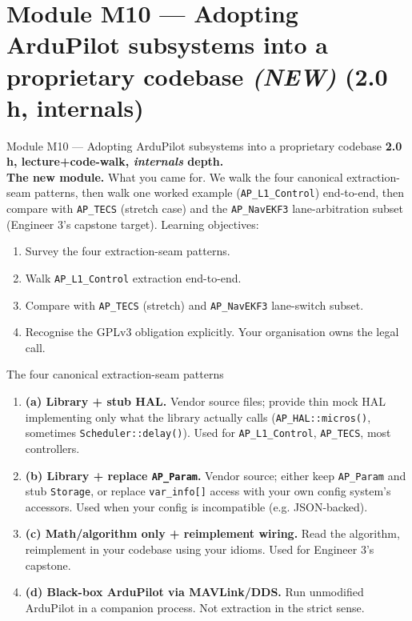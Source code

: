\documentclass[aspectratio=169,11pt]{beamer}
\begin{document}
\section{Module M10 --- Adopting ArduPilot subsystems into a proprietary codebase \emph{(NEW)} (2.0 h, internals)}

\begin{frame}{Module M10 --- Adopting ArduPilot subsystems into a proprietary codebase}
  \textbf{2.0 h, lecture+code-walk, \emph{internals} depth.}\\[1ex]
  \textbf{The new module.} What you came for.
  \vfill
  We walk the four canonical extraction-seam patterns, then walk one worked example (\texttt{AP\_L1\_Control}) end-to-end, then compare with \texttt{AP\_TECS} (stretch case) and the \texttt{AP\_NavEKF3} lane-arbitration subset (Engineer 3's capstone target).
  \vfill
  Learning objectives:
  \begin{enumerate}
    \item Survey the four extraction-seam patterns.
    \item Walk \texttt{AP\_L1\_Control} extraction end-to-end.
    \item Compare with \texttt{AP\_TECS} (stretch) and \texttt{AP\_NavEKF3} lane-switch subset.
    \item Recognise the GPLv3 obligation explicitly. Your organisation owns the legal call.
  \end{enumerate}
\end{frame}

\begin{frame}{The four canonical extraction-seam patterns}
  \begin{enumerate}
    \item \textbf{(a) Library + stub HAL.} Vendor source files; provide thin mock HAL implementing only what the library actually calls (\texttt{AP\_HAL::micros()}, sometimes \texttt{Scheduler::delay()}). Used for \texttt{AP\_L1\_Control}, \texttt{AP\_TECS}, most controllers.
    \item \textbf{(b) Library + replace \texttt{AP\_Param}.} Vendor source; either keep \texttt{AP\_Param} and stub \texttt{Storage}, or replace \texttt{var\_info[]} access with your own config system's accessors. Used when your config is incompatible (e.g. JSON-backed).
    \item \textbf{(c) Math/algorithm only + reimplement wiring.} Read the algorithm, reimplement in your codebase using your idioms. Used for Engineer 3's capstone.
    \item \textbf{(d) Black-box ArduPilot via MAVLink/DDS.} Run unmodified ArduPilot in a companion process. Not extraction in the strict sense.
  \end{enumerate}
\end{frame}
\end{document}
